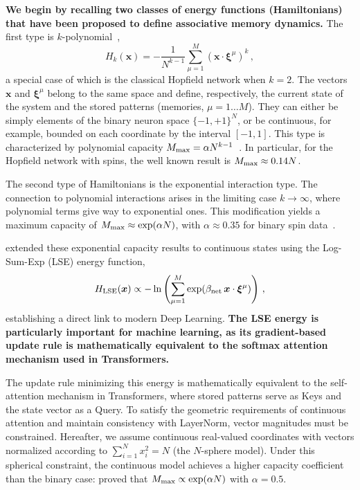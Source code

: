 \documentclass{article}
\theoremstyle{plain}
\theoremstyle{definition}
\theoremstyle{remark}
\begin{document}
\textbf{We begin by recalling two classes of energy functions (Hamiltonians) that have been proposed to define associative memory dynamics.}
The first type is $k$-polynomial~\cite{krotov2016dense}, 
\begin{equation}
    H_k(\bm{x}) = - \frac{1}{N^{k-1}} \sum\limits_{\mu=1}^{M} (\bm{x} \cdot \bm{\xi}^\mu)^k\,,
    \label{eq:H_k}
\end{equation}
a special case of which is the classical Hopfield network \cite{Hopfield1982} when $k=2$. 
The vectors $\bm{x}$ and $\bm{\xi}^\mu$ belong to the same space and define, respectively, the current state of the system and the stored patterns (memories, $\mu=1\dots M$). They can either be simply elements of the binary neuron space $\{-1,+1\}^N$, or be continuous, for example, bounded on each coordinate by the interval $[-1, 1]$. This type is characterized by polynomial capacity $M_{\rm max} = \alpha N^{k-1}$~\cite{krotov2016dense}. In particular, for the Hopfield network with spins, the well known result is $M_{\rm max} \approx 0.14N$.

The second type of Hamiltonians is the exponential interaction type. The connection to polynomial interactions arises in the limiting case $k \to \infty$, where polynomial terms give way to exponential ones. This modification yields a maximum capacity of $M_{\rm max} \approx \exp(\alpha N)$, with $\alpha \approx 0.35$ for binary spin data~\cite{demircigil2017model}.

\citet{ramsauer2021hopfield} extended these exponential capacity results to continuous states using the Log-Sum-Exp (LSE) energy function, 
\begin{equation}
    H_{\rm LSE}(\bm{x}) \propto -\ln \left( \sum_{\mu=1}^M \exp(\beta_{\rm net} \, \bm{x} \cdot \bm{\xi}^\mu) \right) \,,
    \label{eq:lse_energy}
\end{equation}
establishing a direct link to modern Deep Learning.
\textbf{The LSE energy is particularly important for machine learning, as its gradient-based update rule is mathematically equivalent to the softmax attention mechanism used in Transformers.}

The update rule minimizing this energy is mathematically equivalent to the self-attention mechanism in Transformers, where stored patterns serve as Keys and the state vector as a Query. To satisfy the geometric requirements of continuous attention and maintain consistency with LayerNorm, vector magnitudes must be constrained. Hereafter, we assume continuous real-valued coordinates with vectors normalized according to $\sum_{i=1}^{N} x_i^2 = N$ (the $N$-sphere model). Under this spherical constraint, the continuous model achieves a higher capacity coefficient than the binary case: \citet{ramsauer2021hopfield} proved that $M_{\rm max} \propto \exp(\alpha N)$ with $\alpha = 0.5$.
\end{document}
